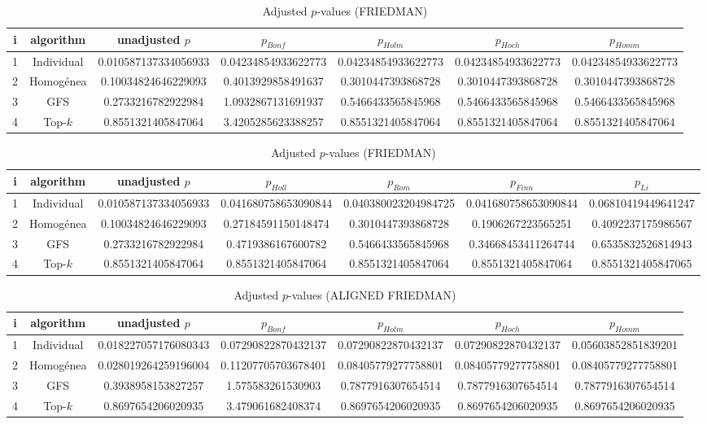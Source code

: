 \documentclass[a4paper,10pt]{article}
\begin{document}
\begin{landscape}
\begin{table}[!htp]
\centering\scriptsize
\caption{Adjusted $p$-values (FRIEDMAN)}
\begin{tabular}{ccccccc}
i&algorithm&unadjusted $p$&$p_{Bonf}$&$p_{Holm}$&$p_{Hoch}$&$p_{Homm}$\\
\hline
1&Individual&0.010587137334056933&0.04234854933622773&0.04234854933622773&0.04234854933622773&0.04234854933622773\\
2&Homogénea&0.10034824646229093&0.4013929858491637&0.3010447393868728&0.3010447393868728&0.3010447393868728\\
3&GFS&0.2733216782922984&1.0932867131691937&0.5466433565845968&0.5466433565845968&0.5466433565845968\\
4&Top-$k$&0.8551321405847064&3.4205285623388257&0.8551321405847064&0.8551321405847064&0.8551321405847064\\
\hline
\end{tabular}
\end{table}

\begin{table}[!htp]
\centering\scriptsize
\caption{Adjusted $p$-values (FRIEDMAN)}
\begin{tabular}{ccccccc}
i&algorithm&unadjusted $p$&$p_{Holl}$&$p_{Rom}$&$p_{Finn}$&$p_{Li}$\\
\hline
1&Individual&0.010587137334056933&0.041680758653090844&0.040380023204984725&0.041680758653090844&0.06810419449641247\\
2&Homogénea&0.10034824646229093&0.27184591150148474&0.3010447393868728&0.1906267223565251&0.4092237175986567\\
3&GFS&0.2733216782922984&0.4719386167600782&0.5466433565845968&0.34668453411264744&0.6535832526814943\\
4&Top-$k$&0.8551321405847064&0.8551321405847064&0.8551321405847064&0.8551321405847064&0.8551321405847065\\
\hline
\end{tabular}
\end{table}


\newpage

\begin{table}[!htp]
\centering\scriptsize
\caption{Adjusted $p$-values (ALIGNED FRIEDMAN)}
\begin{tabular}{ccccccc}
i&algorithm&unadjusted $p$&$p_{Bonf}$&$p_{Holm}$&$p_{Hoch}$&$p_{Homm}$\\
\hline
1&Individual&0.018227057176080343&0.07290822870432137&0.07290822870432137&0.07290822870432137&0.05603852851839201\\
2&Homogénea&0.028019264259196004&0.11207705703678401&0.08405779277758801&0.08405779277758801&0.08405779277758801\\
3&GFS&0.3938958153827257&1.575583261530903&0.7877916307654514&0.7877916307654514&0.7877916307654514\\
4&Top-$k$&0.8697654206020935&3.479061682408374&0.8697654206020935&0.8697654206020935&0.8697654206020935\\
\hline
\end{tabular}
\end{table}


\end{landscape}
\end{document}
